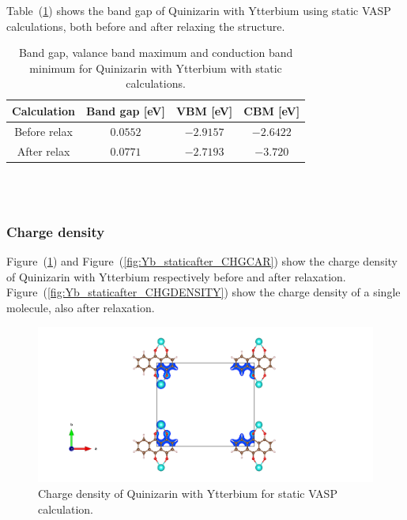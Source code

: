 \documentclass{article}
\begin{document}
      Table~(\ref{tab:bandgapYb}) shows the band gap of Quinizarin with Ytterbium using static VASP calculations, both before and after relaxing the structure. \\

      \begin{table}[H]
        \centering
        \caption{Band gap, valance band maximum and conduction band minimum for Quinizarin with Ytterbium with static calculations. }
        \vspace{0mm}
        \label{tab:bandgapYb}
        \begin{tabular}{|c|c|c|c|}
            \hline
            Calculation & Band gap [eV] & VBM [eV] & CBM [eV]  \\
            \hline \hline
            Before relax & $0.0552$ & $-2.9157$ & $-2.6422$ \\
            After relax & $0.0771$ & $-2.7193$ & $-3.720$ \\
            \hline
        \end{tabular} \\
        \hspace{0pt}\\
      \end{table}

      \vspace{1cm}

    \subsubsection{Charge density}

      Figure~(\ref{fig:Yb_staticbefore_CHGCAR}) and Figure~(\ref{fig:Yb_staticafter_CHGCAR}) show the charge density of Quinizarin with Ytterbium respectively before and after relaxation. Figure~(\ref{fig:Yb_staticafter_CHGDENSITY}) show the charge density of a single molecule, also after relaxation. \\

      \begin{figure}[H]
          \centering
          \includegraphics[width = \textwidth]{../fig/Yb_staticbefore_CHGCAR.png}
          \caption{Charge density of Quinizarin with Ytterbium for static VASP calculation. }
          \label{fig:Yb_staticbefore_CHGCAR}
      \end{figure}
\end{document}

